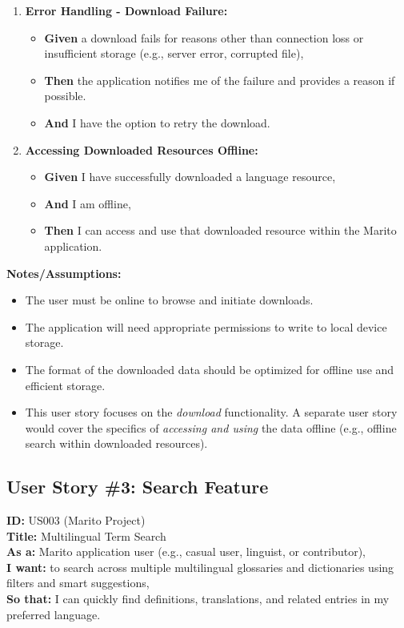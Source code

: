 \documentclass[12pt]{article}
\begin{document}
\begin{enumerate}
    \item \textbf{Error Handling - Download Failure:}
    \begin{itemize}
        \item \textbf{Given} a download fails for reasons other than connection loss or insufficient storage (e.g., server error, corrupted file),
        \item \textbf{Then} the application notifies me of the failure and provides a reason if possible.
        \item \textbf{And} I have the option to retry the download.
    \end{itemize}

    \item \textbf{Accessing Downloaded Resources Offline:}
    \begin{itemize}
        \item \textbf{Given} I have successfully downloaded a language resource,
        \item \textbf{And} I am offline,
        \item \textbf{Then} I can access and use that downloaded resource within the Marito application.
    \end{itemize}
\end{enumerate}

\vspace{1em}
\textbf{Notes/Assumptions:}
\begin{itemize}
    \item The user must be online to browse and initiate downloads.
    \item The application will need appropriate permissions to write to local device storage.
    \item The format of the downloaded data should be optimized for offline use and efficient storage.
    \item This user story focuses on the \textit{download} functionality. A separate user story would cover the specifics of \textit{accessing and using} the data offline (e.g., offline search within downloaded resources).
\end{itemize}


\subsection{User Story \#3: Search Feature}

\textbf{ID:} US003 (Marito Project) \\
\textbf{Title:} Multilingual Term Search \\
\textbf{As a:} Marito application user (e.g., casual user, linguist, or contributor), \\
\textbf{I want:} to search across multiple multilingual glossaries and dictionaries using filters and smart suggestions, \\
\textbf{So that:} I can quickly find definitions, translations, and related entries in my preferred language.
\end{document}
